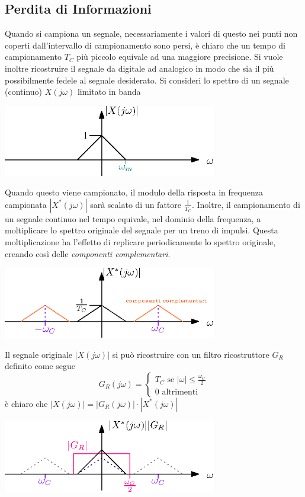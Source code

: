 \documentclass[10pt, letterpaper]{report}
\begin{document}
\subsection{Perdita di Informazioni}
Quando si campiona un segnale, necessariamente i valori di questo nei punti non coperti dall'intervallo di campionamento sono persi, è chiaro che un tempo di campionamento $T_C$ più piccolo equivale ad una maggiore precisione. Si vuole inoltre ricostruire il segnale da digitale ad analogico in modo che sia il più possibilmente fedele al segnale desiderato.\acc 
Si consideri lo spettro di un segnale (continuo) $X(j\omega)$ limitato in banda 
\begin{center}
    \includegraphics[width=0.7\textwidth]{images/segLimitatoBanda.eps}
\end{center}
Quando questo viene campionato, il modulo della risposta in frequenza campionata $|X^*(j\omega)|$ sarà scalato di un fattore $\frac{1}{T_C}$. Inoltre, il campionamento di un segnale continuo nel tempo equivale, nel dominio della frequenza, a moltiplicare lo spettro originale del segnale per un treno di impulsi. Questa moltiplicazione ha l'effetto di replicare periodicamente lo spettro originale, creando così delle \textit{componenti complementari}.
\begin{center}
    \includegraphics[width=0.7\textwidth]{images/segLimitatoBanda2.eps}
\end{center}
Il segnale originale $|X(j\omega)|$ si può ricostruire con un filtro ricostruttore $G_R$ definito come segue 
$$ G_R(j\omega)=\begin{cases}
    T_C \text{ se }|\omega|\le \frac{\omega_C}{2}\\ 
    0 \text{ altrimenti}
\end{cases}$$
è chiaro che $|X(j\omega)|=|G_R(j\omega)|\cdot |X^*(j\omega)|$
\begin{center}
    \includegraphics[width=0.7\textwidth]{images/segLimitatoBanda3.eps}
\end{center}
\end{document}
